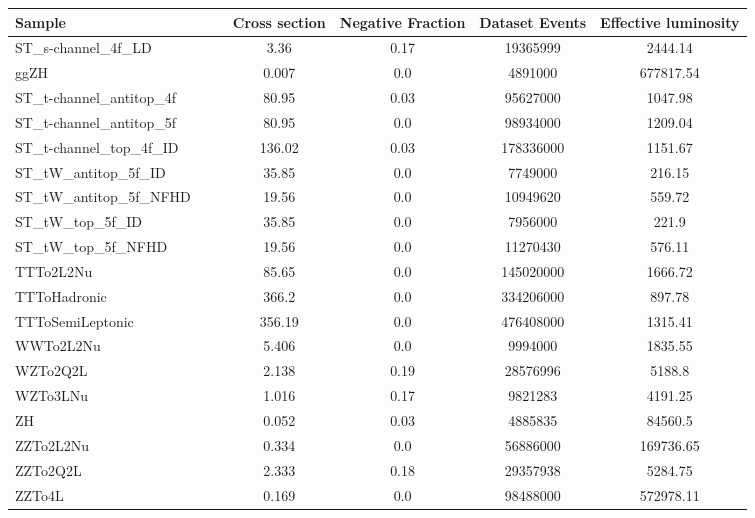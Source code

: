 \begin{tabular}{l|c|c|c|c|c|c}
Sample & & & Cross section  & Negative Fraction & Dataset Events & Effective luminosity \\
\hline
ST\_s-channel\_4f\_LD & & & \num{3.36} & \num{0.17} & \num{19365999} & \num{2444.14} \\
ggZH & & & \num{0.007} & \num{0.0} & \num{4891000} & \num{677817.54} \\
ST\_t-channel\_antitop\_4f & & & \num{80.95} & \num{0.03} & \num{95627000} & \num{1047.98} \\
ST\_t-channel\_antitop\_5f & & & \num{80.95} & \num{0.0} & \num{98934000} & \num{1209.04} \\
ST\_t-channel\_top\_4f\_ID & & & \num{136.02} & \num{0.03} & \num{178336000} & \num{1151.67} \\
ST\_tW\_antitop\_5f\_ID & & & \num{35.85} & \num{0.0} & \num{7749000} & \num{216.15} \\
ST\_tW\_antitop\_5f\_NFHD & & & \num{19.56} & \num{0.0} & \num{10949620} & \num{559.72} \\
ST\_tW\_top\_5f\_ID & & & \num{35.85} & \num{0.0} & \num{7956000} & \num{221.9} \\
ST\_tW\_top\_5f\_NFHD & & & \num{19.56} & \num{0.0} & \num{11270430} & \num{576.11} \\
TTTo2L2Nu & & & \num{85.65} & \num{0.0} & \num{145020000} & \num{1666.72} \\
TTToHadronic & & & \num{366.2} & \num{0.0} & \num{334206000} & \num{897.78} \\
TTToSemiLeptonic & & & \num{356.19} & \num{0.0} & \num{476408000} & \num{1315.41} \\
WWTo2L2Nu & & & \num{5.406} & \num{0.0} & \num{9994000} & \num{1835.55} \\
WZTo2Q2L & & & \num{2.138} & \num{0.19} & \num{28576996} & \num{5188.8} \\
WZTo3LNu & & & \num{1.016} & \num{0.17} & \num{9821283} & \num{4191.25} \\
ZH & & & \num{0.052} & \num{0.03} & \num{4885835} & \num{84560.5} \\
ZZTo2L2Nu & & & \num{0.334} & \num{0.0} & \num{56886000} & \num{169736.65} \\
ZZTo2Q2L & & & \num{2.333} & \num{0.18} & \num{29357938} & \num{5284.75} \\
ZZTo4L & & & \num{0.169} & \num{0.0} & \num{98488000} & \num{572978.11} \\
\end{tabular}